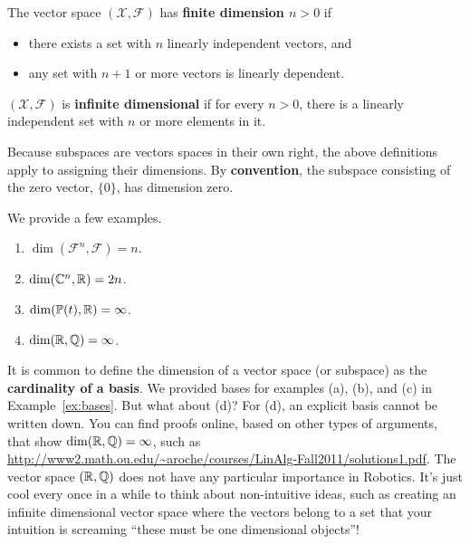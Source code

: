 \begin{definition}
The vector space $(\mathcal{X},\mathcal{F})$ has \textbf{finite dimension $n>0$} if
    \begin{itemize}
        \item there exists a set with $n$ linearly independent vectors, and
        \item any set with $n+1$ or more vectors is linearly dependent.
    \end{itemize}
\end{definition} 
    
\begin{definition} $(\mathcal{X},\mathcal{F})$ is \textbf{infinite dimensional} if for every $n>0$, there is a linearly independent set with $n$ or more elements in it. 
\end{definition}
    
\begin{rem}Because subspaces are vectors spaces in their own right, the above definitions apply to assigning their dimensions. By \textbf{convention}, the subspace consisting of the zero vector, $\{0\}$, has dimension zero. 

\end{rem} 

\begin{example} 
We provide a few examples.
\begin{enumerate}
        \renewcommand{\labelenumi}{(\alph{enumi})}
        \setlength{\itemsep}{.1cm}
    \item $\dim(\mathcal{F}^n,\mathcal{F})=n$. 

    \item $\dim(\mathbb{C}^n,\mathbb R)=2n$.

   \item $\dim(\mathbb{P}(t),\mathbb R)=\infty$.
   
   \item $\dim(\mathbb R,\mathbb Q)=\infty$. 
\end{enumerate}

\end{example}



\begin{rem}
It is common to define the dimension of a vector space (or subspace) as the \textbf{cardinality of a basis}. We provided bases for examples (a), (b), and (c) in Example~\ref{ex:bases}. But what about (d)? For (d), an explicit basis cannot be written down. You can find proofs online, based on other types of arguments, that show $\dim(\mathbb R,\mathbb Q)=\infty$, such as \url{http://www2.math.ou.edu/~aroche/courses/LinAlg-Fall2011/solutions1.pdf}. The vector space $(\mathbb R,\mathbb{Q})$ does not have any particular importance in Robotics. It's just cool every once in a while to think about non-intuitive ideas, such as creating an infinite dimensional vector space where the vectors belong to a set that your intuition is screaming ``these must be one dimensional objects''! 

\end{rem} 



